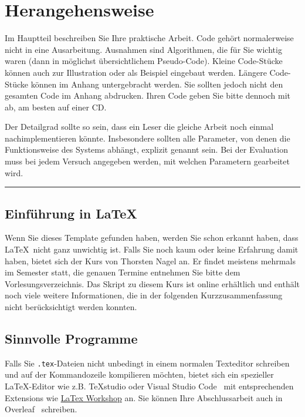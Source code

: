 
\chapter{Herangehensweise}

Im Hauptteil beschreiben Sie Ihre praktische Arbeit. Code gehört normalerweise nicht in eine Ausarbeitung. Ausnahmen sind Algorithmen, die für Sie wichtig waren (dann in möglichst übersichtlichem Pseudo-Code). Kleine Code-Stücke können auch zur Illustration oder als Beispiel eingebaut werden. Längere Code-Stücke können im Anhang untergebracht werden. Sie sollten jedoch nicht den gesamten Code im Anhang abdrucken. Ihren Code geben Sie bitte dennoch mit ab, am besten auf einer CD.

Der Detailgrad sollte so sein, dass ein Leser die gleiche Arbeit noch einmal nachimplementieren könnte. Insbesondere sollten alle Parameter, von denen die Funktionsweise des Systems abhängt, explizit genannt sein. Bei der Evaluation muss bei jedem Versuch angegeben werden, mit welchen Parametern gearbeitet wird.


\hfil\rule{0.4\textwidth}{0.4pt}

\section{Einführung in \LaTeX}
Wenn Sie dieses Template gefunden haben, werden Sie schon erkannt haben, dass \LaTeX\ nicht ganz unwichtig ist. Falls Sie noch kaum oder keine Erfahrung damit haben, bietet sich der Kurs  von Thorsten Nagel an. Er findet meistens mehrmals im Semester statt, die genauen Termine entnehmen Sie bitte dem Vorlesungsverzeichnis. Das Skript zu diesem Kurs ist online erhältlich \cite{thorstennagel2015} und enthält noch viele weitere Informationen, die in der folgenden Kurzzusammenfassung nicht berücksichtigt werden konnten.

\section{Sinnvolle Programme}
Falls Sie \verb|.tex|-Dateien nicht unbedingt in einem normalen Texteditor schreiben und auf der Kommandozeile kompilieren möchten, bietet sich ein spezieller \LaTeX-Editor wie z.B. TeXstudio \cite{texstudio} oder Visual Studio Code~\cite{vscode} mit entsprechenden Extensions wie \href{https://marketplace.visualstudio.com/items?itemName=James-Yu.latex-workshop}{LaTex Workshop} an. Sie können Ihre Abschlussarbeit auch in Overleaf~\cite{overleaf} schreiben.


